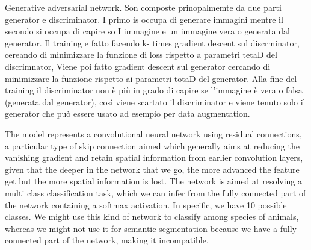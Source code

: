 \begin{box-stud}
    Generative adversarial network. Son composte prinopalmemte da due parti generator e discriminator. I primo is occupa di generare immagini mentre il secondo si occupa di capire so I immagine e un immagine vera o generata dal generator. Il training e fatto facendo k- times gradient descent sul discrminator, cereando di minimizzare la funzione di loss rispetto a parametri tetaD del discrimnator, Viene poi fatto gradient descent sul generator cercando di minimizzare la funzione rispetto ai parametri totaD del generator. Alla fine del training il discriminator non è più in grado di capire se l’immagine è vera o falsa (generata dal generator), così viene scartato il discriminator e viene tenuto solo il generator che può essere usato ad esempio per data augmentation.
\end{box-stud}



\begin{box-stud}
    The model represents a convolutional neural network using residual connections, a particular type of skip connection aimed which generally aims at reducing the vanishing gradient and retain spatial information from earlier convolution layers, given that the deeper in the network that we go, the more advanced the feature get but the more spatial information is lost. The network is aimed at resolving a multi class classification task, which we can infer from the fully connected part of the network containing a softmax activation. In specific, we have 10 possible classes. We might use this kind of network to classify among species of animals, whereas we might not use it for semantic segmentation because we have a fully connected part of the network, making it incompatible.
\end{box-stud}


